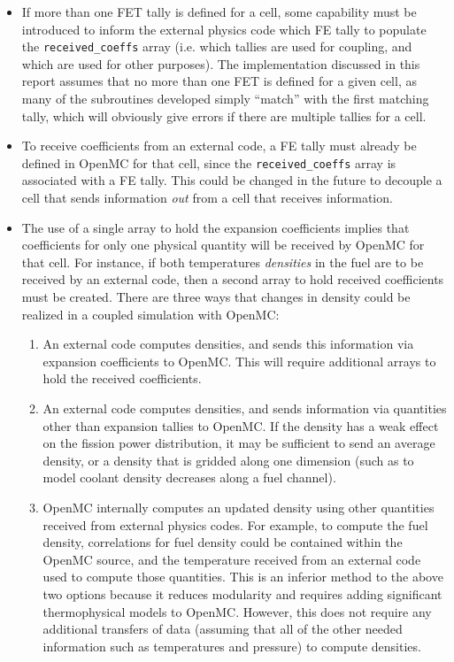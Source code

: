 \documentclass[10pt]{article}
\numberwithin{equation}{section} %
\begin{document}
\begin{itemize}
\color{magenta}
\item If more than one FET tally is defined for a cell, some capability must be introduced to inform the external physics code which FE tally to populate the {\tt received\_coeffs} array (i.e. which tallies are used for coupling, and which are used for other purposes). The implementation discussed in this report assumes that no more than one FET is defined for a given cell, as many of the subroutines developed simply ``match'' with the first matching tally, which will obviously give errors if there are multiple tallies for a cell.
\item To receive coefficients from an external code, a FE tally must already be defined in OpenMC for that cell, since the {\tt received\_coeffs} array is associated with a FE tally. This could be changed in the future to decouple a cell that sends information {\it out} from a cell that receives information.
\item The use of a single array to hold the expansion coefficients implies that coefficients for only one physical quantity will be received by OpenMC for that cell. For instance, if both temperatures {\it densities} in the fuel are to be received by an external code, then a second array to hold received coefficients must be created. \color{black}There are three ways that changes in density could be realized in a coupled simulation with OpenMC:
	\begin{enumerate}
	\item An external code computes densities, and sends this information via expansion coefficients to OpenMC. This will require additional arrays to hold the received coefficients.
	\item An external code computes densities, and sends information via quantities other than expansion tallies to OpenMC. If the density has a weak effect on the fission power distribution, it may be sufficient to send an average density, or a density that is gridded along one dimension (such as to model coolant density decreases along a fuel channel).
	\item OpenMC internally computes an updated density using other quantities received from external physics codes. For example, to compute the fuel density, correlations for fuel density could be contained within the OpenMC source, and the temperature received from an external code used to compute those quantities. This is an inferior method to the above two options because it reduces modularity and requires adding significant thermophysical models to OpenMC. However, this does not require any additional transfers of data (assuming that all of the other needed information such as temperatures and pressure) to compute densities.
	\end{enumerate}
\end{itemize}
\end{document}
